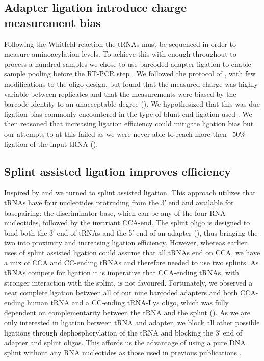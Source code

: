 \documentclass[9pt,lineno]{elife}
\begin{document}
\subsection{Adapter ligation introduce charge measurement bias}
Following the Whitfeld reaction the tRNAs must be sequenced in order to measure aminoacylation levels.
To achieve this with enough throughout to process a hundred samples we chose to use barcoded adapter ligation to enable sample pooling before the RT-PCR step \citep{McGlincy2017-ro}.
We followed the protocol of \cite{Behrens2021-gb}, with few modifications to the oligo design, but found that the measured charge was highly variable between replicates and that the measurements were biased by the barcode identity to an unacceptable degree ().
We hypothesized that this was due ligation bias commonly encountered in the type of blunt-end ligation used \citep{Fuchs2015-nb, Zhuang2012-nu, Jayaprakash2011-ab}.
We then reasoned that increasing ligation efficiency could mitigate ligation bias but our attempts to at this failed as we were never able to reach more then ~50\% ligation of the input tRNA ().



\subsection{Splint assisted ligation improves efficiency}
Inspired by \cite{Smith2015-ht} and \cite{Shigematsu2017-tv} we turned to splint assisted ligation.
This approach utilizes that tRNAs have four nucleotides protruding from the 3′ end and available for basepairing: the discriminator base, which can be any of the four RNA nucleotides, followed by the invariant CCA-end.
The splint oligo is designed to bind both the 3′ end of tRNAs and the 5′ end of an adapter (), thus bringing the two into proximity and increasing ligation efficiency.
However, whereas earlier uses of splint assisted ligation could assume that all tRNAs end on CCA, we have a mix of CCA and CC-ending tRNAs and therefore needed to use two splints.
As tRNAs compete for ligation it is imperative that CCA-ending tRNAs, with stronger interaction with the splint, is not favoured.
Fortunately, we observed a near complete ligation between all of our nine barcoded adapters and both CCA-ending human tRNA and a CC-ending tRNA-Lys oligo, which was fully dependent on complementarity between the tRNA and the splint ().
As we are only interested in ligation between tRNA and adapter, we block all other possible ligations through dephosphorylation of the tRNA and blocking the 3′ end of adapter and splint oligos.
This affords us the advantage of using a pure DNA splint without any RNA nucleotides as those used in previous publications \citep{Smith2015-ht, Shigematsu2017-tv, Pinkard2020-yd, Warren2021-wt, Thomas2021-fi, Lucas2023-vm}.
\end{document}
